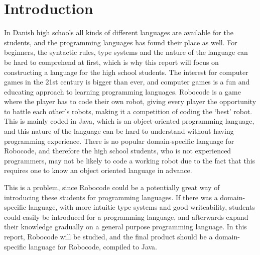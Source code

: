 \chapter{Introduction}

In Danish high schools all kinds of different languages are available for the students, and the programming languages has found their place as well. For beginners, the syntactic rules, type systems and the nature of the language can be hard to comprehend at first, which is why this report will focus on constructing a language for the high school students. The interest for computer games in the 21st century is bigger than ever, and computer games is a fun and educating approach to learning programming languages. Robocode is a game where the player has to code their own robot, giving every player the opportunity to battle each other’s robots, making it a competition of coding the ‘best’ robot. This is mainly coded in Java, which is an object-oriented programming language, and this nature of the language can be hard to understand without having programming experience. There is no popular domain-specific language for Robocode, and therefore the high school students, who is not experienced programmers, may not be likely to code a working robot due to the fact that this requires one to know an object oriented language in advance. 

This is a problem, since Robocode could be a potentially great way of introducing these students for programming languages. If there was a domain-specific language, with more intuitie type systems and good writeability, students could easily be introduced for a programming language, and afterwards expand their knowledge gradually on a general purpose programming language. In this report, Robocode will be studied, and the final product should be a domain-specific language for Robocode, compiled to Java.
	
